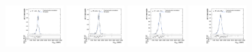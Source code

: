 \begin{figure}[htpb]
  \centering
  \includegraphics[width=0.2\textwidth]{fig/2Dfit/templateVsReco_VBFZprToWW2000_r0_MVV_mu_HP_nobb_LDy_linear.pdf}
  \includegraphics[width=0.2\textwidth]{fig/2Dfit/templateVsReco_VBFZprToWW2000_r0_MVV_mu_LP_nobb_LDy_linear.pdf}
  \includegraphics[width=0.2\textwidth]{fig/2Dfit/templateVsReco_VBFZprToWW2000_r0_MVV_mu_HP_nobb_HDy_linear.pdf}
  \includegraphics[width=0.2\textwidth]{fig/2Dfit/templateVsReco_VBFZprToWW2000_r0_MVV_mu_LP_nobb_HDy_linear.pdf}\\

\end{figure}
